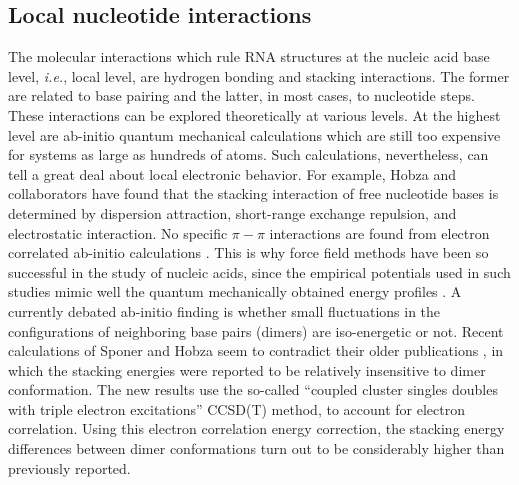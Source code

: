 \subsection{Local nucleotide interactions}
The molecular  interactions which rule  RNA structures at  the nucleic
acid base level, \textit{i.e.},  local level, are hydrogen bonding and
stacking interactions. The former are  related to base pairing and the
latter, in most cases, to  nucleotide steps. These interactions can be
explored  theoretically at various  levels. At  the highest  level are
ab-initio  quantum   mechanical  calculations  which   are  still  too
expensive   for  systems  as   large  as   hundreds  of   atoms.  Such
calculations,  nevertheless,  can  tell   a  great  deal  about  local
electronic behavior.  For example, Hobza and  collaborators have found
that the  stacking interaction of free nucleotide  bases is determined
by   dispersion  attraction,   short-range  exchange   repulsion,  and
electrostatic  interaction.  No  specific $\pi-\pi$  interactions  are
found     from    electron    correlated     ab-initio    calculations
\cite{sponer1996, sponer1997}.  This is  why force field  methods have
been so successful in the  study of nucleic acids, since the empirical
potentials used  in such studies  mimic well the  quantum mechanically
obtained energy profiles \cite{tung2004, sponer2000}.
A currently debated ab-initio finding is whether small fluctuations in
the   configurations   of   neighboring   base  pairs   (dimers)   are
iso-energetic  or  not.  Recent   calculations  of  Sponer  and  Hobza
\cite{sponer2006}   seem  to   contradict  their   older  publications
\cite{sponer2000,  hobza2002},  in which  the  stacking energies  were
reported to  be relatively insensitive to dimer  conformation. The new
results  use  the so-called  ``coupled  cluster  singles doubles  with
triple electron excitations'' CCSD(T)  method, to account for electron
correlation.  Using  this electron correlation  energy correction, the
stacking energy differences between dimer conformations turn out to be
considerably higher than previously reported.

